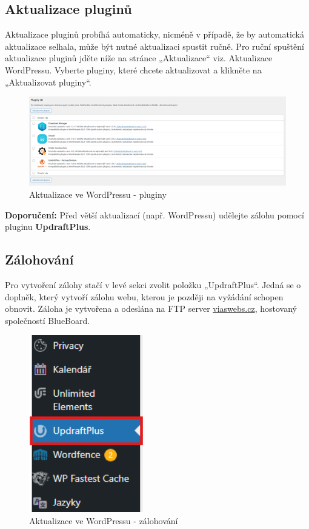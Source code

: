 \documentclass[12pt,a4paper]{article}
\begin{document}
	\subsection{Aktualizace pluginů}
	Aktualizace pluginů probíhá automaticky, nicméně v případě, že by automatická aktualizace selhala, může být nutné aktualizaci spustit ručně. Pro ruční spuštění aktualizace pluginů jděte níže na stránce „Aktualizace“ viz. Aktualizace WordPressu. Vyberte pluginy, které chcete aktualizovat a klikněte na „Aktualizovat pluginy“.
	
		
	\begin{figure}[htp]
		\centering
		\includegraphics[width=18cm]{WPupdateplugin}
		\caption{Aktualizace ve WordPressu - pluginy}
		\label{fig:role}
	\end{figure}
	
	\textbf{Doporučení:} Před větší aktualizací (např. WordPressu) udělejte zálohu pomocí pluginu \textbf{UpdraftPlus}.
	
	\subsection{Zálohování}
	Pro vytvoření zálohy stačí v levé sekci zvolit položku „UpdraftPlus“. Jedná se o doplněk, který vytvoří zálohu webu, kterou je později na vyžádání schopen obnovit. Záloha je vytvořena a odeslána na FTP server \url{viaswebs.cz}, hostovaný společností BlueBoard.
	
	\newpage
	\begin{figure}[htp]
		\centering
		\includegraphics[width=5cm]{WPbackupmenu}
		\caption{Aktualizace ve WordPressu - zálohování}
		\label{fig:role}
	\end{figure}
	
\end{document}
